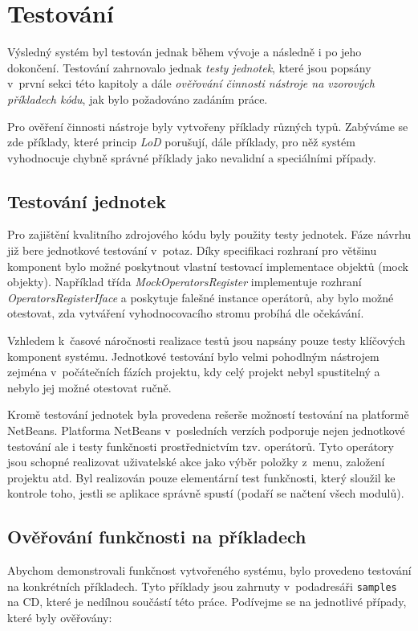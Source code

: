\chapter{Testování}

Výsledný systém byl testován jednak během vývoje a následně i po jeho dokončení. Testování zahrnovalo jednak \emph{testy jednotek}, které jsou popsány v~první sekci této kapitoly a dále \emph{ověřování činnosti nástroje na vzorových příkladech kódu}, jak bylo požadováno zadáním práce.

Pro ověření činnosti nástroje byly vytvořeny příklady různých typů. Zabýváme se zde příklady, které princip \emph{LoD} porušují, dále příklady, pro něž systém vyhodnocuje chybně správné příklady jako nevalidní a speciálními případy.

\section{Testování jednotek}
Pro zajištění kvalitního zdrojového kódu byly použity testy jednotek. Fáze návrhu již bere jednotkové testování v~potaz. Díky specifikaci rozhraní pro většinu komponent bylo možné poskytnout vlastní testovací implementace objektů (mock objekty). Například třída \emph{MockOperatorsRegister} implementuje rozhraní \emph{OperatorsRegisterIface} a poskytuje falešné instance operátorů, aby bylo možné otestovat, zda vytváření vyhodnocovacího stromu probíhá dle očekávání.

Vzhledem k~časové náročnosti realizace testů jsou napsány pouze testy klíčových komponent systému. Jednotkové testování bylo velmi pohodlným nástrojem zejména v~počátečních fázích projektu, kdy celý projekt nebyl spustitelný a nebylo jej možné otestovat ručně.

Kromě testování jednotek byla provedena rešerše možností testování na platformě NetBeans. Platforma NetBeans v~posledních verzích podporuje nejen jednotkové testování ale i testy funkčnosti prostřednictvím tzv. operátorů. Tyto operátory jsou schopné realizovat uživatelské akce jako výběr položky z~menu, založení projektu atd. Byl realizován pouze elementární test funkčnosti, který sloužil ke kontrole toho, jestli se aplikace správně spustí (podaří se načtení všech modulů).

\section{Ověřování funkčnosti na příkladech}
Abychom demonstrovali funkčnost vytvořeného systému, bylo provedeno testování na konkrétních příkladech. Tyto příklady jsou zahrnuty v~podadresáři \verb+samples+ na CD, které je nedílnou součástí této práce. Podívejme se na jednotlivé případy, které byly ověřovány:

